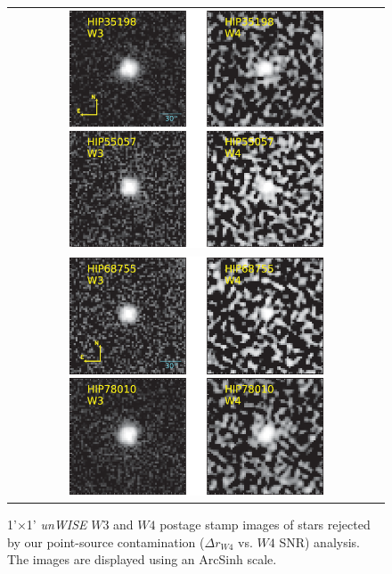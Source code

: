 \begin{figure}
\centering
\begin{tabular}{c}
\includegraphics[width=0.7\textwidth]{Ch4/W3W4_rejected_postagestamps_1}\\
\includegraphics[width=0.7\textwidth]{Ch4/W3W4_rejected_postagestamps_2}
\end{tabular}
\caption{1'$\times$1' \textit{unWISE} $W3$ and $W4$ postage stamp images of stars rejected by our point-source contamination ($\Delta r_{W4}$ vs. $W4$ SNR) analysis. The images are displayed using an ArcSinh scale.}
\label{fig:w3w4_postagestamps}
\end{figure}


